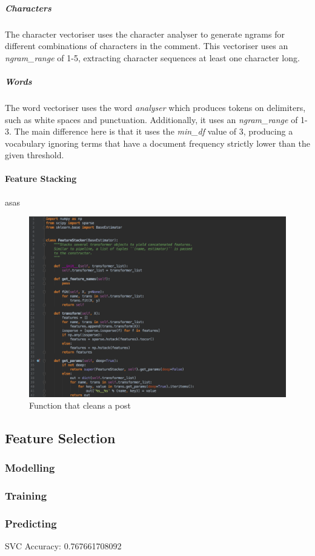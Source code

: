 \subparagraph{Characters} The character vectoriser uses the character analyser to generate ngrams for different combinations of characters in the comment. This vectoriser uses an \textit{ngram\_range} of 1-5, extracting character sequences at least one character long.

\subparagraph{Words} The word vectoriser uses the word \textit{analyser} which produces tokens on delimiters, such as white spaces and punctuation. Additionally, it uses an \textit{ngram\_range} of 1-3. The main difference here is that it uses the \textit{min\_df} value of 3, producing a vocabulary ignoring terms that have a document frequency strictly lower than the given threshold.

\paragraph{Feature Stacking}
asas

\begin{figure}[H]
	\centering
	\includegraphics[width=\textwidth]{Images/Implementation/DataProcessing/AbuseDetection/FeatureStacker}
	\caption{Function that cleans a post}
	\label{fig:AbuseDetection-FeatureStacker}
\end{figure}

\subsection{Feature Selection}


\subsubsection{Modelling}

\subsubsection{Training}

\subsubsection{Predicting}

SVC Accuracy: 0.767661708092

